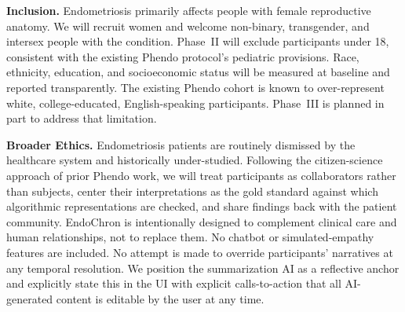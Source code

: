 \textbf{Inclusion.} Endometriosis primarily affects people with female reproductive anatomy. We will recruit women and welcome non-binary, transgender, and intersex people with the condition. Phase~II will exclude participants under 18, consistent with the existing Phendo protocol's pediatric provisions. Race, ethnicity, education, and socioeconomic status will be measured at baseline and reported transparently. The existing Phendo cohort is known to over-represent white, college-educated, English-speaking participants\cite{Urteaga2022Engagement}. Phase~III is planned in part to address that limitation.

\textbf{Broader Ethics.} Endometriosis patients are routinely dismissed by the healthcare system and historically under-studied. Following the citizen-science approach of prior Phendo work\cite{McKillop2016Participatory}, we will treat participants as collaborators rather than subjects, center their interpretations as the gold standard against which algorithmic representations are checked, and share findings back with the patient community. EndoChron is intentionally designed to complement clinical care and human relationships, not to replace them. No chatbot or simulated-empathy features are included. No attempt is made to override participants' narratives at any temporal resolution. We position the summarization AI as a reflective anchor and explicitly state this in the UI with explicit calls-to-action that all AI-generated content is editable by the user at any time.


\newpage
